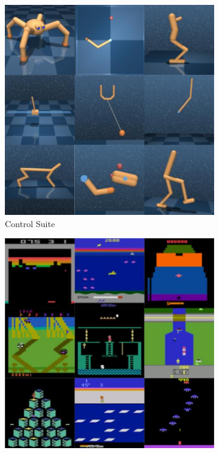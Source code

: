 \begin{figure}[t]
\vspace*{-2ex}
\centering
\begin{subfigure}{.22\textwidth}
\includegraphics[width=\linewidth]{tasks/dmc}
\caption{Control Suite}
\end{subfigure}\hfill
\begin{subfigure}{.22\textwidth}
\includegraphics[width=\linewidth]{tasks/atari}

\end{subfigure}
\end{figure}
